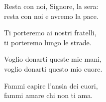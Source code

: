 
\strofa Resta con noi, Signore, la sera:\\
resta con noi e avremo la pace.

\spazio


\spazio

\strofa Ti porteremo ai nostri fratelli,\\
ti porteremo lungo le strade.

\spazio


\spazio

\strofa Voglio donarti queste mie mani,\\
voglio donarti questo mio cuore.

\spazio


\spazio

\strofa Fammi capire l'ansia dei cuori,\\
fammi amare chi non ti ama.

\spazio

